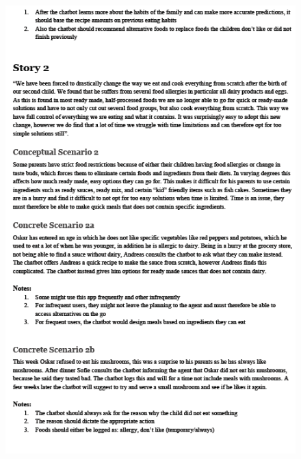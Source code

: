     \begin{figure}[H]
        \centering
        \includegraphics[scale=0.8]{figures/UScen2.png}
    \end{figure} 
